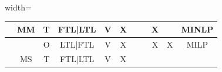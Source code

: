 \begin{table}[h!]
\begin{adjustbox}{width=\textwidth}
\begin{tabular}{|c|c|c|c|c|c|c|l|c|c|c|}
      \autocite{Berman2006InboundCost}                                                   &
      MM                                                                                 &
      T                                                                                  &
      FTL|LTL                                                                            &
      V                                                                                  &
      X                                                                                  &
                                                                                         &                &
      X                                                                                  &
                                                                                         &
      MINLP                                                                                                                                             \\ \hline
      \autocite{Sancak2011Multi-itemPolicy}                                              &
                                                                                         &
      O                                                                                  &
      LTL|FTL                                                                            &
      V                                                                                  &
      X                                                                                  &
                                                                                         &                &
      X                                                                                  &
      X                                                                                  &
      MILP                                                                                                                                              \\ \hline
      \autocite{Schoneberg2010AnNetworks}                                                &
      MS                                                                                 &
      T                                                                                  &
      FTL|LTL                                                                            &
      V                                                                                  &
      X                                                                                  &

\end{tabular}
\end{adjustbox}
\end{table}

